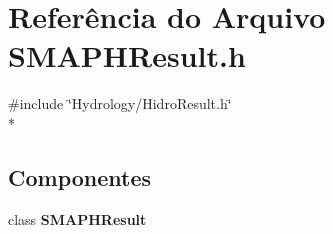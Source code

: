 \section{Referência do Arquivo S\+M\+A\+P\+H\+Result.\+h}
\label{_s_m_a_p_h_result_8h}
{\ttfamily \#include \char`\"{}Hydrology/\+Hidro\+Result.\+h\char`\"{}}\\*
\subsection*{Componentes}
\begin{DoxyCompactItemize}
\item 
class {\bf S\+M\+A\+P\+H\+Result}
\end{DoxyCompactItemize}
